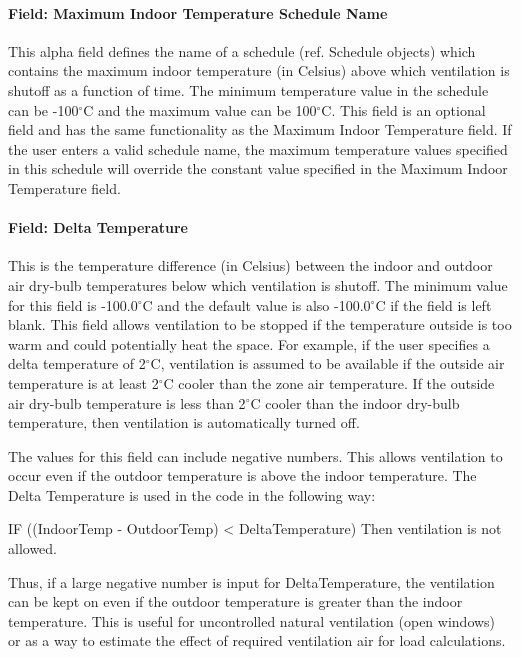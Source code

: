 \paragraph{Field: Maximum Indoor Temperature Schedule Name}\label{field-maximum-indoor-temperature-schedule-name}

This alpha field defines the name of a schedule (ref. Schedule objects) which contains the maximum indoor temperature (in Celsius) above which ventilation is shutoff as a function of time. The minimum temperature value in the schedule can be -100$^\circ$C and the maximum value can be 100$^\circ$C. This field is an optional field and has the same functionality as the Maximum Indoor Temperature field. If the user enters a valid schedule name, the maximum temperature values specified in this schedule will override the constant value specified in the Maximum Indoor Temperature field.

\paragraph{Field: Delta Temperature}\label{field-delta-temperature}

This is the temperature difference (in Celsius) between the indoor and outdoor air dry-bulb temperatures below which ventilation is shutoff. The minimum value for this field is -100.0$^\circ$C and the default value is also -100.0$^\circ$C if the field is left blank. This field allows ventilation to be stopped if the temperature outside is too warm and could potentially heat the space. For example, if the user specifies a delta temperature of 2$^\circ$C, ventilation is assumed to be available if the outside air temperature is at least 2$^\circ$C cooler than the zone air temperature. If the outside air dry-bulb temperature is less than 2$^\circ$C cooler than the indoor dry-bulb temperature, then ventilation is automatically turned off.

The values for this field can include negative numbers. This allows ventilation to occur even if the outdoor temperature is above the indoor temperature. The Delta Temperature is used in the code in the following way:

IF ((IndoorTemp - OutdoorTemp) \textless{} DeltaTemperature) Then ventilation is not allowed.

Thus, if a large negative number is input for DeltaTemperature, the ventilation can be kept on even if the outdoor temperature is greater than the indoor temperature. This is useful for uncontrolled natural ventilation (open windows) or as a way to estimate the effect of required ventilation air for load calculations.

